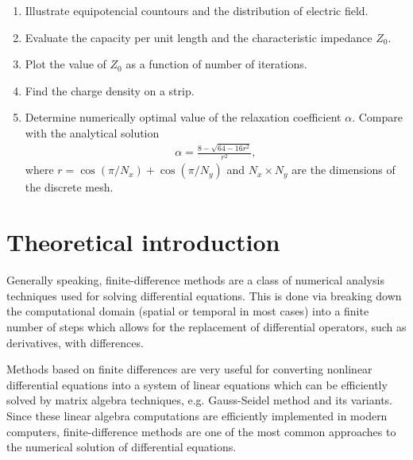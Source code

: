 \documentclass[11pt,a4paper]{article}
\begin{document}
\begin{enumerate}[label=(\alph*)]
    \item Illustrate equipotencial countours and the distribution of electric field.
    \item Evaluate the capacity per unit length and the characteristic impedance $Z_0$.
    \item Plot the value of $Z_0$ as a function of number of iterations.
    \item Find the charge density on a strip.
    \item Determine numerically optimal value of the relaxation coefficient $\alpha$. Compare with the analytical solution
    \begin{align}
        \label{eq:alpha-analytical-solution}
        \alpha = \frac{8-\sqrt{64-16r^2}}{r^2},
    \end{align}
    where $r = \cos(\pi/N_x) + \cos(\pi/N_y)$ and $N_x \times N_y$ are the dimensions of the discrete mesh.
\end{enumerate}

\newpage\section{Theoretical introduction}
Generally speaking, finite-difference methods are a class of numerical analysis techniques used for solving differential equations. This is done via breaking down the computational domain (spatial or temporal in most cases) into a finite number of steps which allows for the replacement of differential operators, such as derivatives, with differences.

Methods based on finite differences are very useful for converting nonlinear differential equations into a system of linear equations which can be efficiently solved by matrix algebra techniques, e.g. Gauss-Seidel method and its variants. Since these linear algebra computations are efficiently implemented in modern computers, finite-difference methods are one of the most common approaches to the numerical solution of differential equations.
\end{document}
